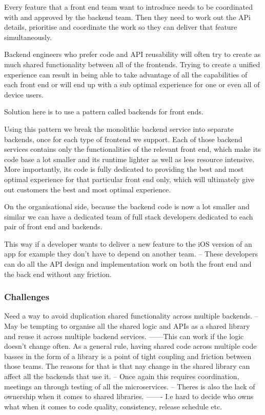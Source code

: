 Every feature that a front end team want to introduce needs to be coordinated with and approved by the backend team.
Then they need to work out the APi details, prioritise and coordinate the work so they can deliver that feature simultaneously.

Backend engineers who prefer code and API reusability will often try to create as much shared functionality between all of the frontends.
Trying to create a unified experience can result in being able to take advantage of all the capabilities of each front end or will end up with a sub optimal experience for one or even all of device users.

Solution here is to use a pattern called backends for front ends.

Using this pattern we break the monolithic backend service into separate backends, once for each type of frontend we support.
Each of those backend services contains only the functionalities of the relevant front end, which make its code base a lot smaller and its runtime lighter as well as less resource intensive.
More importantly, its code is fully dedicated to providing the best and most optimal experience for that particular front end only, which will ultimately give out customers the best and most optimal experience.

On the organisational side, because the backend code is now a lot smaller and similar we can have a dedicated team of full stack developers dedicated to each pair of front end and backends.

This way if a developer wants to deliver a new feature to the iOS version of an app for example they don't have to depend on another team.
-- These developers can do all the API design and implementation work on both the front end and the back end without any friction.

\subsubsection{Challenges}
Need a way to avoid duplication shared functionality across multiple backends.
-- May be tempting to organise all the shared logic and APIs as a shared library and reuse it across multiple backend services.
------This can work if the logic doesn't change often.
As a general rule, having shared code across multiple code basses in the form of a library is a point of tight coupling and friction between those teams.
The reasons for that is that nay change in the shared library can affect all the backends that use it.
-- Once again this requires coordination, meetings an through testing of all the microservices.
-- Theres is also the lack of ownership when it comes to shared libraries.
------- I.e hard to decide who owns what when it comes to code quality, consistency, release schedule etc.

